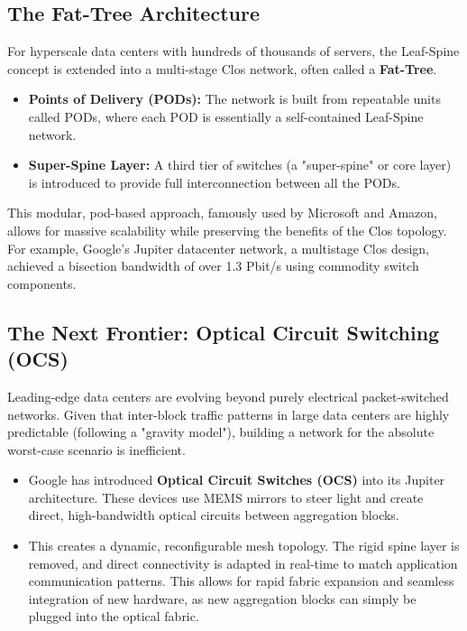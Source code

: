 \subsection{The Fat-Tree Architecture}
For hyperscale data centers with hundreds of thousands of servers, the Leaf-Spine concept is extended into a multi-stage Clos network, often called a \textbf{Fat-Tree}.
\begin{itemize}
    \item \textbf{Points of Delivery (PODs):} The network is built from repeatable units called PODs, where each POD is essentially a self-contained Leaf-Spine network.
    \item \textbf{Super-Spine Layer:} A third tier of switches (a "super-spine" or core layer) is introduced to provide full interconnection between all the PODs.
\end{itemize}
This modular, pod-based approach, famously used by Microsoft and Amazon, allows for massive scalability while preserving the benefits of the Clos topology. For example, Google's Jupiter datacenter network, a multistage Clos design, achieved a bisection bandwidth of over 1.3 Pbit/s using commodity switch components.

\subsection{The Next Frontier: Optical Circuit Switching (OCS)}
Leading-edge data centers are evolving beyond purely electrical packet-switched networks. Given that inter-block traffic patterns in large data centers are highly predictable (following a "gravity model"), building a network for the absolute worst-case scenario is inefficient.
\begin{itemize}
    \item Google has introduced \textbf{Optical Circuit Switches (OCS)} into its Jupiter architecture. These devices use MEMS mirrors to steer light and create direct, high-bandwidth optical circuits between aggregation blocks.
    \item This creates a dynamic, reconfigurable mesh topology. The rigid spine layer is removed, and direct connectivity is adapted in real-time to match application communication patterns. This allows for rapid fabric expansion and seamless integration of new hardware, as new aggregation blocks can simply be plugged into the optical fabric.
\end{itemize}

